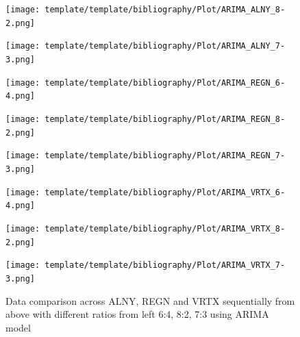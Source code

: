 \documentclass{ieeeojies}
\begin{document}
\begin{enumerate}
\begin{figure}[H]
\begin{minipage}{0.155\textwidth}
    \end{minipage}
    \hfill
    \begin{minipage}{0.155\textwidth}
    \centering
    \texttt{[image: template/template/bibliography/Plot/ARIMA\_ALNY\_8-2.png]}
    \end{minipage}
    \hfill
    \begin{minipage}{0.155\textwidth}
    \centering
    \texttt{[image: template/template/bibliography/Plot/ARIMA\_ALNY\_7-3.png]}
    \end{minipage}
    \hfill
    \begin{minipage}{0.155\textwidth}
    \centering
    \texttt{[image: template/template/bibliography/Plot/ARIMA\_REGN\_6-4.png]}
    \end{minipage}
    \hfill
    \begin{minipage}{0.155\textwidth}
    \centering
    \texttt{[image: template/template/bibliography/Plot/ARIMA\_REGN\_8-2.png]}
    \end{minipage}
    \hfill
    \begin{minipage}{0.155\textwidth}
    \centering
    \texttt{[image: template/template/bibliography/Plot/ARIMA\_REGN\_7-3.png]}
    \end{minipage}
    \hfill
    \begin{minipage}{0.155\textwidth}
    \centering
    \texttt{[image: template/template/bibliography/Plot/ARIMA\_VRTX\_6-4.png]}
    \end{minipage}
    \hfill
    \begin{minipage}{0.155\textwidth}
    \centering
    \texttt{[image: template/template/bibliography/Plot/ARIMA\_VRTX\_8-2.png]}
    \end{minipage}
    \hfill
    \begin{minipage}{0.155\textwidth}
    \centering
    \texttt{[image: template/template/bibliography/Plot/ARIMA\_VRTX\_7-3.png]}
    \end{minipage}
\caption{Data comparison across ALNY, REGN and VRTX sequentially from above with different ratios from left 6:4, 8:2, 7:3 using ARIMA model}
\label{fig:combined}
\end{figure}


\end{enumerate}
\end{document}
